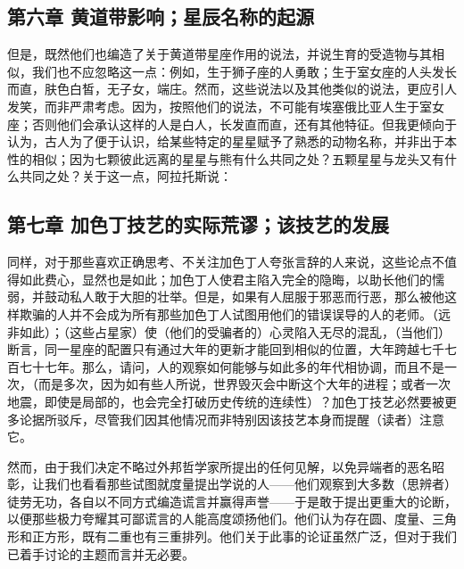 \subsection{第六章 黄道带影响；星辰名称的起源}

但是，既然他们也编造了关于黄道带星座作用的说法，并说生育的受造物与其相似，我们也不应忽略这一点：例如，生于狮子座的人勇敢；生于室女座的人头发长而直，肤色白皙，无子女，端庄。然而，这些说法以及其他类似的说法，更应引人发笑，而非严肃考虑。因为，按照他们的说法，不可能有埃塞俄比亚人生于室女座；否则他们会承认这样的人是白人，长发直而直，还有其他特征。但我更倾向于认为，古人为了便于认识，给某些特定的星星赋予了熟悉的动物名称，并非出于本性的相似；因为七颗彼此远离的星星与熊有什么共同之处？五颗星星与龙头又有什么共同之处？关于这一点，阿拉托斯说：\par

\par


\subsection{第七章 加色丁技艺的实际荒谬；该技艺的发展}

同样，对于那些喜欢正确思考、不关注加色丁人夸张言辞的人来说，这些论点不值得如此费心，显然也是如此；加色丁人使君主陷入完全的隐晦，以助长他们的懦弱，并鼓动私人敢于大胆的壮举。但是，如果有人屈服于邪恶而行恶，那么被他这样欺骗的人并不会成为所有那些加色丁人试图用他们的错误误导的人的老师。（远非如此）；（这些占星家）使（他们的受骗者的）心灵陷入无尽的混乱，（当他们）断言，同一星座的配置只有通过大年的更新才能回到相似的位置，大年跨越七千七百七十七年。那么，请问，人的观察如何能够与如此多的年代相协调，而且不是一次，（而是多次，因为如有些人所说，世界毁灭会中断这个大年的进程；或者一次地震，即使是局部的，也会完全打破历史传统的连续性）？加色丁技艺必然要被更多论据所驳斥，尽管我们因其他情况而非特别因该技艺本身而提醒（读者）注意它。\par

然而，由于我们决定不略过外邦哲学家所提出的任何见解，以免异端者的恶名昭彰，让我们也看看那些试图就度量提出学说的人——他们观察到大多数（思辨者）徒劳无功，各自以不同方式编造谎言并赢得声誉——于是敢于提出更重大的论断，以便那些极力夸耀其可鄙谎言的人能高度颂扬他们。他们认为存在圆、度量、三角形和正方形，既有二重也有三重排列。他们关于此事的论证虽然广泛，但对于我们已着手讨论的主题而言并无必要。\par

